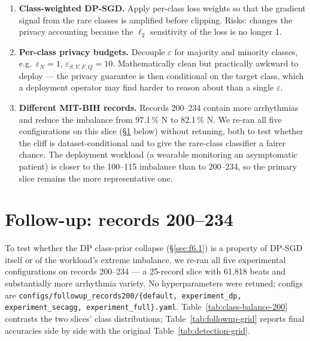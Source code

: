 \documentclass[11pt,a4paper]{report}
\begin{document}
\begin{enumerate}[leftmargin=*]
  \item \textbf{Class-weighted DP-SGD.} Apply per-class loss weights so
  that the gradient signal from the rare classes is amplified before
  clipping. Risks: changes the privacy accounting because the
  $\ell_2$ sensitivity of the loss is no longer 1.
  \item \textbf{Per-class privacy budgets.} Decouple $\varepsilon$ for
  majority and minority classes, e.g.\ $\varepsilon_N = 1$,
  $\varepsilon_{S, V, F, Q} = 10$. Mathematically clean but practically
  awkward to deploy --- the privacy guarantee is then conditional on the
  target class, which a deployment operator may find harder to reason
  about than a single $\varepsilon$.
  \item \textbf{Different MIT-BIH records.} Records 200--234 contain
  more arrhythmias and reduce the imbalance from 97.1\,\% N to
  82.1\,\% N. We re-ran all five configurations on this slice
  (\S\ref{sec:f6.3} below) without retuning, both to test whether the
  cliff is dataset-conditional and to give the rare-class classifier a
  fairer chance. The deployment workload (a wearable monitoring an
  asymptomatic patient) is closer to the 100--115 imbalance than to
  200--234, so the primary slice remains the more representative one.
\end{enumerate}

\section{Follow-up: records 200--234}\label{sec:f6.3}

To test whether the DP class-prior collapse (\S\ref{sec:f6.1}) is a
property of DP-SGD itself or of the workload's extreme imbalance, we
re-ran all five experimental configurations on records 200--234 ---
a 25-record slice with 61{,}818 beats and substantially more
arrhythmia variety. No hyperparameters were retuned; configs are
\texttt{configs/followup\_records200/\{default, experiment\_dp,
experiment\_secagg, experiment\_full\}.yaml}.
Table~\ref{tab:class-balance-200} contrasts the two slices' class
distributions; Table~\ref{tab:followup-grid} reports final accuracies
side by side with the original Table~\ref{tab:detection-grid}.
\end{document}
